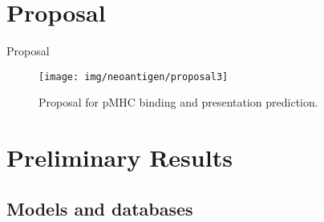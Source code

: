 \documentclass[10pt]{beamer}
\newcommand{\1}{
	\setbeamertemplate{background}{
		\texttt{[image: img/1]}
		\tikz[overlay] \fill[fill opacity=0.75,fill=white] (0,0) rectangle (-\paperwidth,\paperheight);
	}
}
\begin{document}
\section{Proposal}



\begin{frame}{Proposal}{}

	\vspace{0.5cm}
	\begin{figure}[H]
		\centering
		\texttt{[image: img/neoantigen/proposal3]}	
		\caption{Proposal for pMHC binding and presentation prediction.}
		\label{fig:neo_det_seq}
	\end{figure}
\end{frame}




\section{Preliminary Results}

\subsection{Models and databases}
\end{document}
